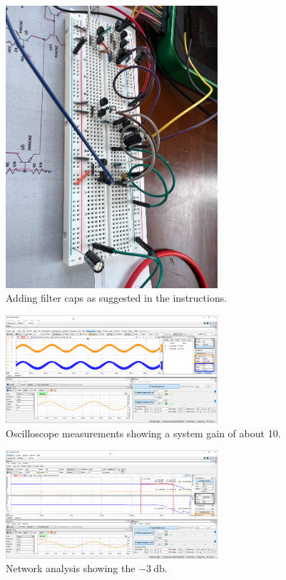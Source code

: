 \documentclass{article}
\begin{document}
	\begin{figure}[H]
	    \centering
	    \includegraphics[width=0.7\textwidth]{added_caps}
	    \caption{Adding filter caps as suggested in the instructions.}
	\end{figure}
	
	
	
	
	\begin{figure}[H]
	    \centering
	    \includegraphics[width=0.7\textwidth]{wfm-gain}
	    \caption{Oscilloscope measurements showing a system gain of about 10.}
	\end{figure}
	
	
	\begin{figure}[H]
	    \centering
	    \includegraphics[width=0.7\textwidth]{wfm-freq}
	    \caption{Network analysis showing the $\SI{-3}{\decibel}$.}
	\end{figure}
	
\end{document}
